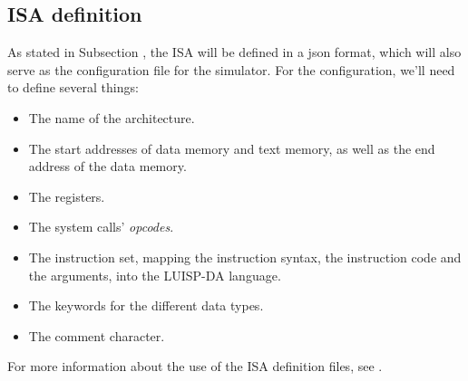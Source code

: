 \subsection{ISA definition}\label{subsec:isa-design}
As stated in Subsection , the \gls{ISA} will be defined in a \gls{json} format, which will also serve as the configuration file for the simulator. For the configuration, we'll need to define several things:
\begin{itemize}
  \item The name of the architecture.
  \item The start addresses of \gls{data memory} and \gls{text memory}, as well as the end address of the \gls{data memory}.
  \item The \glspl{register}.
  \item The \glspl{system call}' \textit{opcodes}.
  \item The instruction set, mapping the  instruction syntax, the instruction code and the arguments, into the LUISP-DA language.
  \item The keywords for the different data types.
  \item The comment character.
\end{itemize}

\noindent
For more information about the use of the \gls{ISA} definition files, see .

